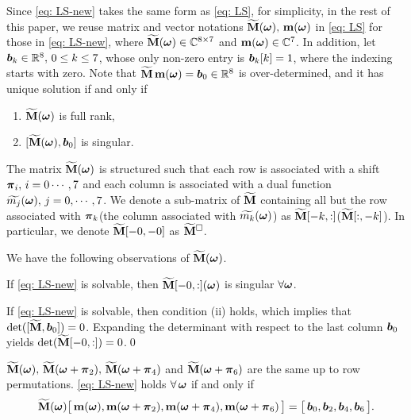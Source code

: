 Since \eqref{eq: LS-new} takes the same form as \eqref{eq: LS}, for simplicity, in the rest of this paper, we reuse matrix and vector notations $\widetilde{\mathbf{M}}(\boldsymbol{\omega}),\,\mathbf{m}(\boldsymbol{\omega}) $ in \eqref{eq: LS} for those in \eqref{eq: LS-new}, where $\widetilde{\mathbf{M}}(\boldsymbol{\omega})\in\mathbb{C}^{8\times 7}$ and $\mathbf{m}(\boldsymbol{\omega})\in\mathbb{C}^7$. In addition, let $\boldsymbol{b}_k \in\mathbb{R}^8,\, 0\leq k\leq 7$, whose only non-zero entry is $\boldsymbol{b}_k[k] = 1$, where the indexing starts with zero. Note that $\widetilde{\mathbf{M}}\,\mathbf{m}(\boldsymbol{\omega}) = \boldsymbol{b}_0\in\mathbb{R}^8$ is over-determined, and it has unique solution if and only if 

\begin{enumerate}[leftmargin=.5in]
\item[\mylabel{cond: 1}{(\ref{sec: solve-quincunx}.i)}] $\widetilde{\mathbf{M}}(\boldsymbol{\omega})$ is full rank,
\item[\mylabel{cond: 2}{(\ref{sec: solve-quincunx}.ii)}] $[\widetilde{\mathbf{M}}(\boldsymbol{\omega}), \boldsymbol{b}_0]$ is singular.
\end{enumerate}
The matrix $\widetilde{\mathbf{M}}(\boldsymbol{\omega})$ is structured such that each row is associated with a shift $\boldsymbol{\pi}_i,\,i=0\cdots,7$ and each column is associated with a dual function $\widetilde{m_{j}}(\boldsymbol{\omega}),\,j=0,\cdots,7$. We denote a sub-matrix of $\widetilde{\mathbf{M}}$ containing all but the row associated with $\boldsymbol{\pi}_k$(the column associated with $\widetilde{m_{k}}(\boldsymbol{\omega})$) as $\widetilde{\mathbf{M}}[-k,:]$($\widetilde{\mathbf{M}}[:,-k]$).
In particular, we denote $\widetilde{\mathbf{M}}[-0,-0]$ as $\widetilde{\mathbf{M}}^{\Box}$.

We have the following observations of $\widetilde{\mathbf{M}}(\boldsymbol{\omega})$.
\begin{lemma}\label{lem: subM-singular}
If \eqref{eq: LS-new} is solvable, then $\widetilde{\mathbf{M}}[-0,:](\boldsymbol{\omega})$ is singular $\forall \boldsymbol{\omega}$.
\end{lemma}
If \eqref{eq: LS-new} is solvable, then condition (ii) holds, which implies that $\det([\widetilde{\mathbf{M}},\boldsymbol{b}_0]) = 0$. Expanding the determinant with respect to the last column $\boldsymbol{b}_0$ yields $\det(\widetilde{\mathbf{M}}[-0,:]) = 0$.\qed

\begin{lemma}\label{lem: M-symmetry}
$\widetilde{\mathbf{M}}(\boldsymbol{\omega}),\,\widetilde{\mathbf{M}}(\boldsymbol{\omega}+\boldsymbol{\pi}_2),\,\widetilde{\mathbf{M}}(\boldsymbol{\omega}+\boldsymbol{\pi}_4)$ and $\widetilde{\mathbf{M}}(\boldsymbol{\omega}+\boldsymbol{\pi}_6)$ are the same up to row permutations. \eqref{eq: LS-new} holds $\forall \, \boldsymbol{\omega}$ if and only if 
\begin{align*}
\widetilde{\mathbf{M}}(\boldsymbol{\omega}) \big[\,\mathbf{m}(\boldsymbol{\omega}),\mathbf{m}(\boldsymbol{\omega}+\boldsymbol{\pi}_2),\mathbf{m}(\boldsymbol{\omega}+\boldsymbol{\pi}_4),\mathbf{m}(\boldsymbol{\omega}+\boldsymbol{\pi}_6)\,\big] = \big[\,\boldsymbol{b}_0,\boldsymbol{b}_2,\boldsymbol{b}_4,\boldsymbol{b}_6\,\big].
\end{align*}
\end{lemma}

